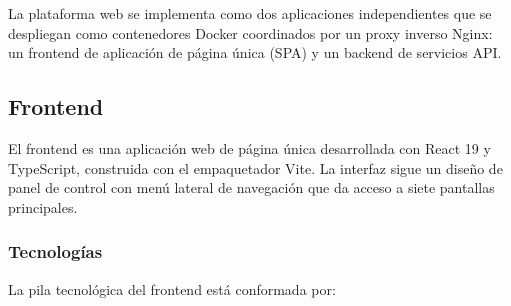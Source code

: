 La plataforma web se implementa como dos aplicaciones independientes que se
despliegan como contenedores Docker coordinados por un proxy inverso Nginx:
un frontend de aplicación de página única (SPA) y un backend de servicios API.

\subsection{Frontend}

El frontend es una aplicación web de página única desarrollada con React 19 y
TypeScript, construida con el empaquetador Vite. La interfaz sigue un diseño
de panel de control con menú lateral de navegación que da acceso a siete
pantallas principales.

\subsubsection*{Tecnologías}

La pila tecnológica del frontend está conformada por:

